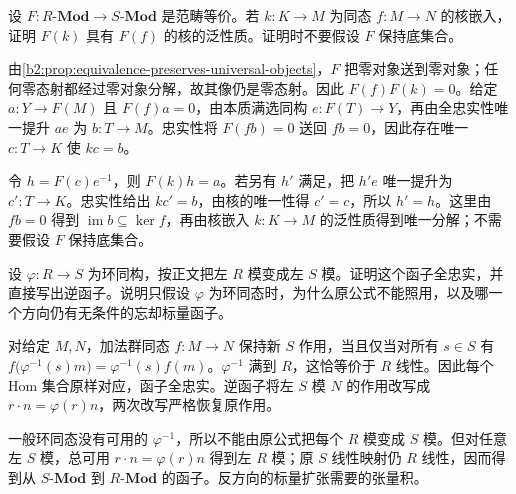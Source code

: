 \begin{exercise}\label{b2:ex:05-equivalence-kernels}
	设 \(F:R\text{-}\mathbf{Mod}\rightarrow S\text{-}\mathbf{Mod}\) 是范畴等价。若 \(k:K\rightarrow M\) 为同态 \(f:M\rightarrow N\) 的核嵌入，证明 \(F(k)\) 具有 \(F(f)\) 的核的泛性质。证明时不要假设 \(F\) 保持底集合。
\end{exercise}
\begin{solution}
	由\cref{b2:prop:equivalence-preserves-universal-objects}，\(F\) 把零对象送到零对象；任何零态射都经过零对象分解，故其像仍是零态射。因此 \(F(f)F(k)=0\)。给定 \(a:Y\rightarrow F(M)\) 且 \(F(f)a=0\)，由本质满选同构 \(e:F(T)\rightarrow Y\)，再由全忠实性唯一提升 \(ae\) 为 \(b:T\rightarrow M\)。忠实性将 \(F(fb)=0\) 送回 \(fb=0\)，因此存在唯一 \(c:T\rightarrow K\) 使 \(kc=b\)。

	令 \(h=F(c)e^{-1}\)，则 \(F(k)h=a\)。若另有 \(h'\) 满足，把 \(h'e\) 唯一提升为 \(c':T\rightarrow K\)。忠实性给出 \(kc'=b\)，由核的唯一性得 \(c'=c\)，所以 \(h'=h\)。这里由 \(fb=0\) 得到 \(\operatorname{im}b\subseteq\ker f\)，再由核嵌入 \(k:K\rightarrow M\) 的泛性质得到唯一分解；不需要假设 \(F\) 保持底集合。
\end{solution}

\begin{exercise}\label{b2:ex:05-relabel-scalars}
	设 \(\varphi:R\rightarrow S\) 为环同构，按正文把左 \(R\) 模变成左 \(S\) 模。证明这个函子全忠实，并直接写出逆函子。说明只假设 \(\varphi\) 为环同态时，为什么原公式不能照用，以及哪一个方向仍有无条件的忘却标量函子。
\end{exercise}
\begin{solution}
	对给定 \(M,N\)，加法群同态 \(f:M\rightarrow N\) 保持新 \(S\) 作用，当且仅当对所有 \(s\in S\) 有 \(f\bigl(\varphi^{-1}(s)m\bigr)=\varphi^{-1}(s)f(m)\)。\(\varphi^{-1}\) 满到 \(R\)，这恰等价于 \(R\) 线性。因此每个 Hom 集合原样对应，函子全忠实。逆函子将左 \(S\) 模 \(N\) 的作用改写成 \(r\cdot n=\varphi(r)n\)，两次改写严格恢复原作用。

	一般环同态没有可用的 \(\varphi^{-1}\)，所以不能由原公式把每个 \(R\) 模变成 \(S\) 模。但对任意左 \(S\) 模，总可用 \(r\cdot n=\varphi(r)n\) 得到左 \(R\) 模；原 \(S\) 线性映射仍 \(R\) 线性，因而得到从 \(S\text{-}\mathbf{Mod}\) 到 \(R\text{-}\mathbf{Mod}\) 的函子。反方向的标量扩张需要的张量积。
\end{solution}
